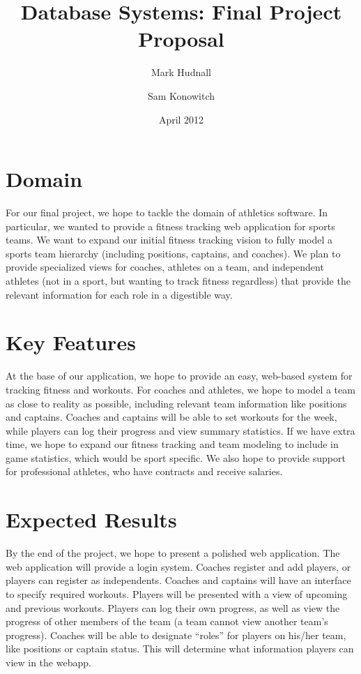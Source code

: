 \documentclass{article}
\title{Database Systems: Final Project Proposal}
\author{Mark Hudnall \and Sam Konowitch}
\date{April 2012}
\begin{document}
    \maketitle
    \section*{Domain}
    For our final project, we hope to tackle the domain of athletics software. In particular, 
    we wanted to provide a fitness tracking web application for sports teams. We want to expand 
    our initial fitness tracking vision to fully model a sports team hierarchy (including 
    positions, captains, and coaches). We plan to provide specialized views for coaches, 
    athletes on a team, and independent athletes (not in a sport, but wanting to track fitness 
    regardless) that provide the relevant information for each role in a digestible way. 

    \section*{Key Features}
    At the base of our application, we hope to provide an easy, web-based system for tracking 
    fitness and workouts. For coaches and athletes, we hope to model a team as close to reality 
    as possible, including relevant team information like positions and captains. Coaches and 
    captains will be able to set workouts for the week, while players can log their progress 
    and view summary statistics. If we have extra time, we hope to expand our fitness tracking 
    and team modeling to include in game statistics, which would be sport specific. We also 
    hope to provide support for professional athletes, who have contracts and receive salaries. 

    \section*{Expected Results}
    By the end of the project, we hope to present a polished web application. The web 
    application will provide a login system. Coaches register and add players, or players 
    can register as independents. Coaches and captains will have an interface to specify 
    required workouts. Players will be presented with a view of upcoming and previous workouts. 
    Players can log their own progress, as well as view the progress of other members of the 
    team (a team cannot view another team’s progress). Coaches will be able to designate “roles”
    for players on his/her team, like positions or captain status. This will determine what 
    information players can view in the webapp. 
\end{document}
